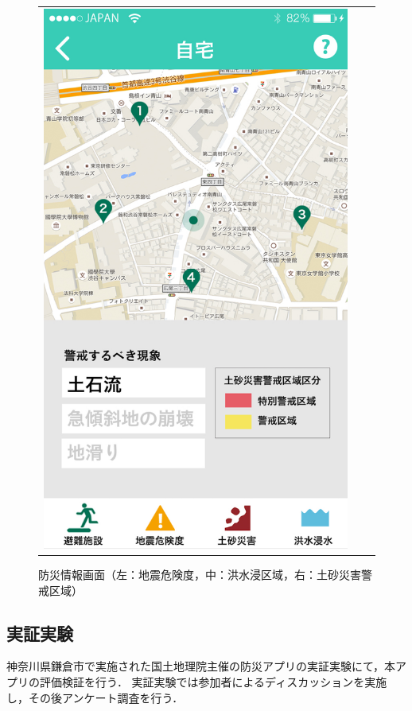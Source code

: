 \documentclass[a4paper]{jsarticle}
\begin{document}
\begin{figure}[H]
\begin{center}
\begin{tabular}{ccc}
\begin{minipage}{0.3\hsize}
      \includegraphics[width=\hsize]{./images/mbs_sediment.jpg}
    \end{minipage}

  \end{tabular}
    \caption{防災情報画面（左：地震危険度，中：洪水浸区域，右：土砂災害警戒区域）}
    \label{fig:screen-structure-02}
  \end{center}
\end{figure}
\fi


\subsection{実証実験}
神奈川県鎌倉市で実施された国土地理院主催の防災アプリの実証実験にて，本アプリの評価検証を行う．
実証実験では参加者によるディスカッションを実施し，その後アンケート調査を行う．
\end{document}
